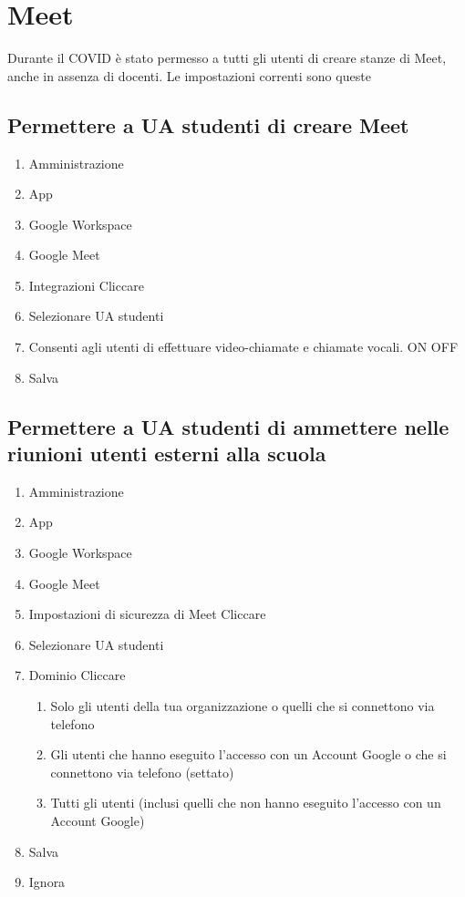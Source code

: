 \chapter{Meet}
Durante il COVID è stato permesso a tutti gli utenti di creare stanze di Meet, anche in assenza di docenti. Le impostazioni correnti sono queste
\section{Permettere a  UA studenti di creare Meet}
\begin{enumerate}
\item Amministrazione
\item App
\item Google Workspace
\item Google Meet
\item Integrazioni Cliccare 
\item Selezionare UA studenti
\item Consenti agli utenti di effettuare video-chiamate e chiamate vocali. ON OFF
\item Salva
\end{enumerate}
\section{Permettere a UA studenti di ammettere nelle riunioni utenti esterni alla scuola}
\begin{enumerate}
	\item Amministrazione
	\item App
	\item Google Workspace
	\item Google Meet
	\item Impostazioni di sicurezza di Meet Cliccare 
	\item Selezionare UA studenti
	\item Dominio Cliccare
	\begin{enumerate}
		\item 
		Solo gli utenti della tua organizzazione o quelli che si connettono via telefono
		\item 
		Gli utenti che hanno eseguito l'accesso con un Account Google o che si connettono via telefono (settato)
		\item 
		Tutti gli utenti (inclusi quelli che non hanno eseguito l'accesso con un Account Google)
	\end{enumerate}
	\item Salva
	\item Ignora
\end{enumerate}
